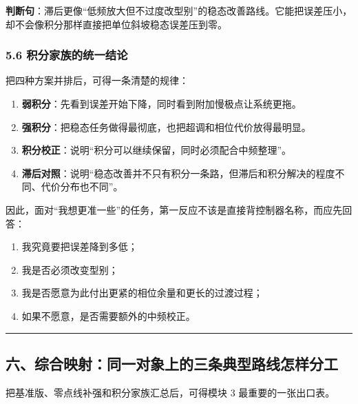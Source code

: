 \documentclass[
  11pt]{article}
\providecommand{\tightlist}{%
  \setlength{\itemsep}{0pt}\setlength{\parskip}{0pt}}
\begin{document}
\textbf{判断句}：滞后更像``低频放大但不过度改型别''的稳态改善路线。它能把误差压小，却不会像积分那样直接把单位斜坡稳态误差压到零。

\subsubsection{5.6
积分家族的统一结论}\label{ux79efux5206ux5bb6ux65cfux7684ux7edfux4e00ux7ed3ux8bba}

把四种方案并排后，可得一条清楚的规律：

\begin{enumerate}
\def\labelenumi{\arabic{enumi}.}
\tightlist
\item
  \textbf{弱积分}：先看到误差开始下降，同时看到附加慢极点让系统更拖。
\item
  \textbf{强积分}：把稳态任务做得最彻底，也把超调和相位代价放得最明显。
\item
  \textbf{积分校正}：说明``积分可以继续保留，同时必须配合中频整理''。
\item
  \textbf{滞后对照}：说明``稳态改善并不只有积分一条路，但滞后和积分解决的程度不同、代价分布也不同''。
\end{enumerate}

因此，面对``我想更准一些''的任务，第一反应不该是直接背控制器名称，而应先回答：

\begin{enumerate}
\def\labelenumi{\arabic{enumi}.}
\tightlist
\item
  我究竟要把误差降到多低；
\item
  我是否必须改变型别；
\item
  我是否愿意为此付出更紧的相位余量和更长的过渡过程；
\item
  如果不愿意，是否需要额外的中频校正。
\end{enumerate}

\begin{center}\rule{0.5\linewidth}{0.5pt}\end{center}

\subsection{六、综合映射：同一对象上的三条典型路线怎样分工}\label{ux516dux7efcux5408ux6620ux5c04ux540cux4e00ux5bf9ux8c61ux4e0aux7684ux4e09ux6761ux5178ux578bux8defux7ebfux600eux6837ux5206ux5de5}

把基准版、零点线补强和积分家族汇总后，可得模块 3 最重要的一张出口表。
\end{document}
